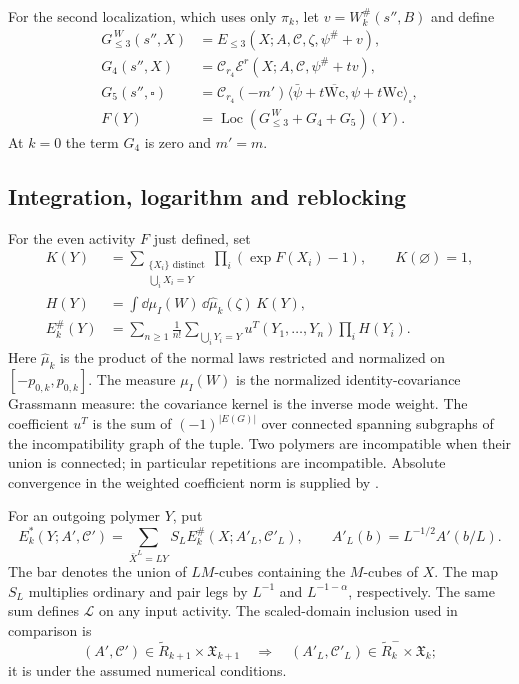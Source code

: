 For the second localization, which uses only $\pi_k$, let
$v=W_k^\#(s'',B)$ and define
\begin{align}
 G_{\le3}^{\,W}(s'',X)&=E_{\le3}(X;A,\mathscr C,\zeta,
                                                      \psi^\#+v),
                                      \label{eq:rgnl-GW}\\
 G_4(s'',X)&=\mathcal C_{r_4}
                  \mathscr E^r(X;A,\mathscr C,\psi^\#+tv),\\
 G_5(s'',\square)&=\mathcal C_{r_4}(-m')
                 \langle\bar\psi+t\overline{\mathrm{Wc}},
                                   \psi+t\mathrm{Wc}\rangle_\square,\\
 F(Y)&=\operatorname{Loc}(G_{\le3}^{\,W}+G_4+G_5)(Y).
                                      \label{eq:rgnl-finite-activity}
\end{align}
At $k=0$ the term $G_4$ is zero and $m'=m$.


\subsection{Integration, logarithm and reblocking}
For the even activity $F$ just defined, set
\begin{align*}
 K(Y)&=\sum_{\substack{\{X_i\}\text{ distinct}\\\bigcup_iX_i=Y}}
             \prod_i(\exp F(X_i)-1),\qquad K(\varnothing)=1,\\
 H(Y)&=\int\dd\mu_I(W)\,\dd\widehat\mu_k(\zeta)\,K(Y),\\
 E_k^\#(Y)&=\sum_{n\ge1}\frac1{n!}
       \sum_{\bigcup_iY_i=Y}u^T(Y_1,\ldots,Y_n)\prod_iH(Y_i).
\end{align*}
Here $\widehat\mu_k$ is the product of the normal laws restricted
and normalized on $[-p_{0,k},p_{0,k}]$. The measure $\mu_I(W)$ is
the normalized identity-covariance Grassmann measure: the covariance
kernel is the inverse mode weight. The coefficient $u^T$ is the
sum of $(-1)^{|E(G)|}$ over connected spanning subgraphs of the
incompatibility graph of the tuple. Two polymers are incompatible
when their union is connected; in particular repetitions are incompatible.
Absolute convergence in the weighted coefficient norm is supplied by
\cite[Proposition~6.1]{NonlinearStep}.

For an outgoing polymer $Y$, put
\[
 E_k^*(Y;A',\mathscr C')=\sum_{\bar X^L=LY}
              S_LE_k^\#(X;A'_L,\mathscr C'_L),\qquad
 A'_L(b)=L^{-1/2}A'(b/L).
\]
The bar denotes the union of $LM$-cubes containing the $M$-cubes of $X$.
The map $S_L$ multiplies ordinary and pair legs by $L^{-1}$ and
$L^{-1-\alpha}$, respectively. The same sum defines $\mathcal L$
on any input activity. The scaled-domain inclusion used in comparison is
\begin{equation}\label{eq:rg-scaled-domain-inclusion}
 (A',\mathscr C')\in\widetilde R_{k+1}\times\mathfrak X_{k+1}
 \quad\Longrightarrow\quad
 (A'_L,\mathscr C'_L)\in\widetilde R_k^-\times\mathfrak X_k;
\end{equation}
it is \cite[(29)]{NormalizedContraction} under the assumed numerical conditions.
\printbibliography


